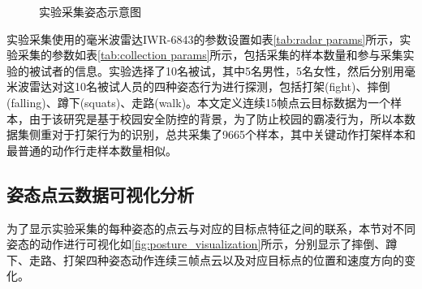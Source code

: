 \begin{figure}[htbp]
	\centering
	\caption{实验采集姿态示意图}
	\label{fig:posture collection}
\end{figure}
实验采集使用的毫米波雷达IWR-6843的参数设置如表\eqref{tab:radar params}所示，实验采集的参数如表\eqref{tab:collection params}所示，包括采集的样本数量和参与采集实验的被试者的信息。实验选择了10名被试，其中5名男性，5名女性，然后分别用毫米波雷达对这10名被试人员的四种姿态行为进行探测，包括打架(fight)、摔倒(falling)、蹲下(squats)、走路(walk)。本文定义连续15帧点云目标数据为一个样本，由于该研究是基于校园安全防控的背景，为了防止校园的霸凌行为，所以本数据集侧重对于打架行为的识别，总共采集了9665个样本，其中关键动作打架样本和最普通的动作行走样本数量相似。


\subsection{姿态点云数据可视化分析}
为了显示实验采集的每种姿态的点云与对应的目标点特征之间的联系，本节对不同姿态的动作进行可视化如\eqref{fig:posture_visualization}所示，分别显示了摔倒、蹲下、走路、打架四种姿态动作连续三帧点云以及对应目标点的位置和速度方向的变化。

